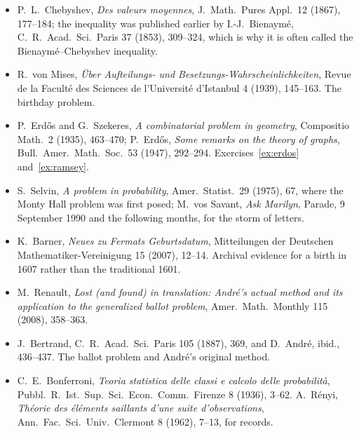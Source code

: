 \begin{itemize}
\item P.~L.~Chebyshev, \emph{Des valeurs moyennes}, J.\ Math.\ Pures Appl.\ 12 (1867), 177--184; the inequality was published earlier by I.-J.~Bienaym\'e, C.\ R.\ Acad.\ Sci.\ Paris 37 (1853), 309--324, which is why it is often called the Bienaym\'e--Chebyshev inequality.
\item R.~von Mises, \emph{\"Uber Aufteilungs- und Besetzungs-\allowbreak Wahrscheinlichkeiten}, Revue de la Facult\'e des Sciences de l'Universit\'e d'Istanbul 4 (1939), 145--163. The birthday problem.
\item P.~Erd\H{o}s and G.~Szekeres, \emph{A combinatorial problem in geometry}, Compositio Math.\ 2 (1935), 463--470; P.~Erd\H os, \emph{Some remarks on the theory of graphs}, Bull.\ Amer.\ Math.\ Soc.\ 53 (1947), 292--294. Exercises~\ref{ex:erdos} and~\ref{ex:ramsey}.
\item S.~Selvin, \emph{A problem in probability}, Amer.\ Statist.\ 29 (1975), 67, where the Monty Hall problem was first posed; M.~vos Savant, \emph{Ask Marilyn}, Parade, 9 September 1990 and the following months, for the storm of letters.
\item K.~Barner, \emph{Neues zu Fermats Geburtsdatum}, Mitteilungen der Deutschen Mathematiker-Vereinigung 15 (2007), 12--14. Archival evidence for a birth in 1607 rather than the traditional 1601.
\item M.~Renault, \emph{Lost (and found) in translation: Andr\'e's actual method and its application to the generalized ballot problem}, Amer.\ Math.\ Monthly 115 (2008), 358--363.
\item J.~Bertrand, C.\ R.\ Acad.\ Sci.\ Paris 105 (1887), 369, and D.~Andr\'e, ibid., 436--437. The ballot problem and Andr\'e's original method.
\item C.~E.~Bonferroni, \emph{Teoria statistica delle classi e calcolo delle probabilit\`a}, Pubbl.\ R.\ Ist.\ Sup.\ Sci.\ Econ.\ Comm.\ Firenze 8 (1936), 3--62. A.~R\'enyi, \emph{Th\'eorie des \'el\'ements saillants d'une suite d'observations}, Ann.\ Fac.\ Sci.\ Univ.\ Clermont 8 (1962), 7--13, for records.
\end{itemize}
